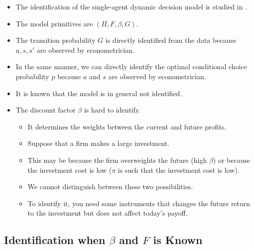 \documentclass[
]{book}
\providecommand{\tightlist}{%
  \setlength{\itemsep}{0pt}\setlength{\parskip}{0pt}}
\begin{document}
\begin{itemize}
\tightlist
\item
  The identification of the single-agent dynamic decision model is studied in \citet{magnacIdentifyingDynamicDiscrete2002}.
\item
  The model primitives are \((\Pi, F, \beta, G)\).
\item
  The transition probability \(G\) is directly identified from the data because \(a, s, s'\) are observed by econometrician.
\item
  In the same manner, we can directly identify the optimal conditional choice probability \(p\) because \(a\) and \(s\) are observed by econometrician.
\item
  It is known that the model is in general not identified.
\item
  The discount factor \(\beta\) is hard to identify.

  \begin{itemize}
  \tightlist
  \item
    It determines the weights between the current and future profits.
  \item
    Suppose that a firm makes a large investment.
  \item
    This may be because the firm overweights the future (high \(\beta\)) or because the investment cost is low (\(\pi\) is such that the investment cost is low).
  \item
    We cannot distinguish between these two possibilities.
  \item
    To identify it, you need some instruments that changes the future return to the investment but does not affect today's payoff.
  \end{itemize}
\end{itemize}

\hypertarget{identification-when-beta-and-f-is-known}{%
\subsection{\texorpdfstring{Identification when \(\beta\) and \(F\) is Known}{Identification when \textbackslash beta and F is Known}}\label{identification-when-beta-and-f-is-known}}
\end{document}
